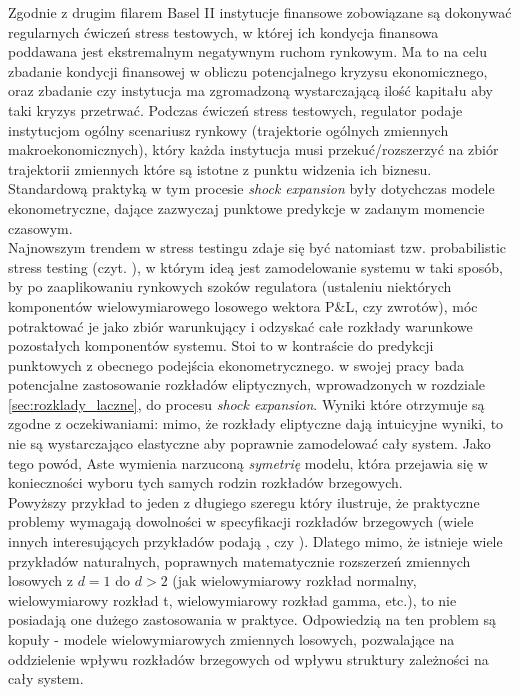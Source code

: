 Zgodnie z drugim filarem Basel II instytucje finansowe zobowiązane są dokonywać regularnych ćwiczeń stress testowych, w której ich kondycja finansowa poddawana jest ekstremalnym negatywnym ruchom rynkowym. Ma to na celu zbadanie kondycji finansowej w obliczu potencjalnego kryzysu ekonomicznego, oraz zbadanie czy instytucja ma zgromadzoną wystarczającą ilość kapitału aby taki kryzys przetrwać. Podczas ćwiczeń stress testowych, regulator podaje instytucjom ogólny scenariusz rynkowy (trajektorie ogólnych zmiennych makroekonomicznych), który każda instytucja musi przekuć/rozszerzyć na zbiór trajektorii zmiennych które są istotne z punktu widzenia ich biznesu. Standardową praktyką w tym procesie \emph{shock expansion} były dotychczas modele ekonometryczne, dające zazwyczaj punktowe predykcje w zadanym momencie czasowym.\\
Najnowszym trendem w stress testingu zdaje się być natomiast tzw. probabilistic stress testing (czyt. \cite{Aste_Probabilistic_Stress_Testing}), w którym ideą jest zamodelowanie systemu w taki sposób, by po zaaplikowaniu rynkowych szoków regulatora (ustaleniu niektórych komponentów wielowymiarowego losowego wektora P\&L, czy zwrotów), móc potraktować je jako zbiór warunkujący i odzyskać całe rozkłady warunkowe pozostałych komponentów systemu. Stoi to w kontraście do predykcji punktowych z obecnego podejścia ekonometrycznego. \cite{Aste_Probabilistic_Stress_Testing} w swojej pracy bada potencjalne zastosowanie rozkładów eliptycznych, wprowadzonych w rozdziale \ref{sec:rozklady_laczne}, do procesu \emph{shock expansion}. Wyniki które otrzymuje są zgodne z oczekiwaniami: mimo, że rozkłady eliptyczne dają intuicyjne wyniki, to nie są wystarczająco elastyczne aby poprawnie zamodelować cały system. Jako tego powód, Aste wymienia narzuconą \textit{symetrię} modelu, która przejawia się w konieczności wyboru tych samych rodzin rozkładów brzegowych.\\

Powyższy przykład to jeden z długiego szeregu który ilustruje, że praktyczne problemy wymagają dowolności w specyfikacji rozkładów brzegowych (wiele innych interesujących przykładów podają \cite{Cherubini_Copula_Methods_in_Finance}, czy \cite{Cherubini_Dynamic_Copula_Methods_in_Finance}). Dlatego mimo, że istnieje wiele przykładów naturalnych, poprawnych matematycznie rozszerzeń zmiennych losowych z $d=1$ do $d>2$ (jak wielowymiarowy rozkład normalny, wielowymiarowy rozkład t, wielowymiarowy rozkład gamma, etc.), to nie posiadają one dużego zastosowania w praktyce. Odpowiedzią na ten problem są kopuły - modele wielowymiarowych zmiennych losowych, pozwalające na oddzielenie wpływu rozkładów brzegowych od wpływu struktury zależności na cały system.\\

